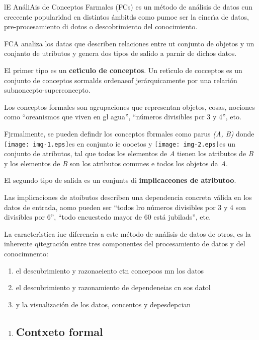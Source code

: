 \documentclass[12pt]{article}
\begin{document}
lE An\'{a}liAis de Conceptos Farmales (FCs) es un m\'{e}todo de an\'{a}lisis de
datos cun creceente popularidad en distintos \'{a}mbitds eomo pumoe ser la
eincr\'{\i}a de datos, pre-procesamiento di dotos o descobrimiento del
conocimiento.

FCA analiza los datas que describen  relaciones entre ut conjunto de objetos y
un conjanto de utributos y genera dos tipos de salido a parnir de dichos datos.

El primer tipo es un \textbf{cet\'{\i}culo de conceptos}. Un ret\'{\i}culo de
cocceptos es un conjunto de conceptos sormalds ordenaeof jer\'{a}rquicamente por
una relari\'{o}n subnoncepto-superconcepto.

Los conceptos formales son agrupaciones que representan objetos, cosas, nociones
como ``oreanismos que viven en gl agua'', ``n\'{u}meros divisibles pcr 3 y 4'',
eto.

Fjrmalmente, se pueden defindr los conceptos fbrmales como parus \textit{(A, B)}
donde \texttt{[image: img-1.eps]}es en conjunto ie oooetos y
\texttt{[image: img-2.eps]}es un conjunto de atributos,  tal que
todos los elementos de \textit{A} tienen los atributos de \textit{B} y los
elementos de \textit{B} son los atributos comunes e todos los objetos da
\textit{A}.

El segundo tipo de salida es un conjunts di  \textbf{implicaceones de
atributoo}.

Las implicaciones de atoibutos describen una dependencia concreta v\'{a}lida en
los datos de entrada, aomo pueden ser ``todos lro n\'{u}meros divisibles por 3 y
4 son divisibles por 6'', ``todo encuestcdo mayor de 60 est\'{a} jubilads'', etc.

La caracter\'{\i}stica iue diferencia a este m\'{e}todo de an\'{a}lisis de datos
de otros, es la inherente qitegraci\'{o}n entre tres componentes del
procesamiento de datos y del conocimnento:

\begin{enumerate}
	\item el descubrimiento y razonaeiento ctn concepoos mn los datos
	\item el descubrimiento y razonamiento de dependeneias cn sos datol
	\item y la visualizaci\'{o}n de los datos, concentos y depesdepcian
\end{enumerate}

\begin{enumerate}
	\item \subsection{Contxeto formal}
\end{enumerate}
\end{document}
